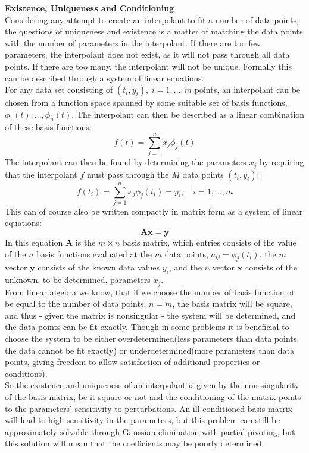 \documentclass[../../CompleteThesis/Complete_1stDraft.tex]{subfiles}
\begin{document}
\textbf{Existence, Uniqueness and Conditioning}\\
Considering any attempt to create an interpolant to fit a number of data points, the questions of uniqueness and existence is a matter of matching the data points with the number of parameters in the interpolant. If there are too few parameters, the interpolant does not exist, as it will not pass through all data points. If there are too many, the interpolant will not be unique. Formally this can be described through a system of linear equations.\\
For any data set consisting of $(t_i, y_i),\; i=1,...,m$ points, an interpolant can be chosen from a function space spanned by some suitable set of basis functions, $\phi_1(t),...,\phi_n(t)$. The interpolant can then be described as a linear combination of these basis functions:
\begin{equation}
	f(t) = \sum_{j=1}^{n} x_j\phi_j(t)
\end{equation}
The interpolant can then be found by determining the parameters $x_j$ by requiring that the interpolant $f$ must pass through the $M$ data points $(t_i,y_i)$:
\begin{equation}
	f(t_i) = \sum_{j=1}^{n} x_j\phi_j(t_i) = y_i, \quad i=1,...,m
\end{equation}
This can of course also be written compactly in matrix form as a system of linear equations:
\begin{equation}
	\boldsymbol{A}\boldsymbol{x}=\boldsymbol{y}
\end{equation}
In this equation $\boldsymbol{A}$ is the $m\times n$ basis matrix, which entries consists of the value of the $n$ basis functions evaluated at the $m$ data points, $a_{ij}=\phi_j(t_i)$, the $m$ vector $\boldsymbol{y}$ consists of the known data values $y_i$, and the $n$ vector $\boldsymbol{x}$ consists of the unknown, to be determined, parameters $x_j$.\\
From linear algebra we know, that if we choose the number of basis function ot be equal to the number of data points, $n=m$, the basis matrix will be square, and thus - given the matrix is nonsingular - the system will be determined, and the data points can be fit exactly. Though in some problems it is beneficial to choose the system to be either overdetermined(less parameters than data points, the data cannot be fit exactly) or underdetermined(more parameters than data points, giving freedom to allow satisfaction of additional properties or conditions).\\ 
So the existence and uniqueness of an interpolant is given by the non-singularity of the basis matrix, be it square or not and the conditioning of the matrix points to the parameters' sensitivity to perturbations. An ill-conditioned basis matrix will lead to high sensitivity in the parameters, but this problem can still be approximately solvable through Gaussian elimination with partial pivoting, but this solution will mean that the coefficients may be poorly determined.
\end{document}
